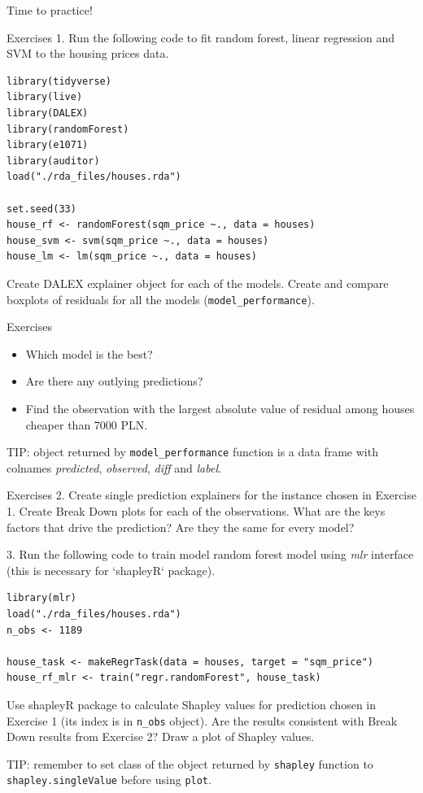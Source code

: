 \documentclass[xcolor={dvipsnames}]{beamer}
\begin{document}
\begin{frame}{Time to practice!}
	
\end{frame}


\begin{frame}[fragile]{Exercises}
1. Run the following code to fit random forest, linear regression and SVM to the housing prices data.
\begin{lstlisting}
library(tidyverse)
library(live)
library(DALEX)
library(randomForest)
library(e1071)
library(auditor)
load("./rda_files/houses.rda")

set.seed(33)
house_rf <- randomForest(sqm_price ~., data = houses)
house_svm <- svm(sqm_price ~., data = houses)
house_lm <- lm(sqm_price ~., data = houses)
\end{lstlisting}
Create DALEX explainer object for each of the models. 
Create and compare boxplots of residuals for all the models (\texttt{model\_performance}). 
\end{frame}

\begin{frame}{Exercises}
\begin{itemize}
	\item Which model is the best?
	\item Are there any outlying predictions?
	\item Find the observation with the largest absolute value of residual among houses cheaper than 7000 PLN. 
\end{itemize}

TIP: object returned by \texttt{model\_performance} function is a data frame with colnames 
\textit{predicted}, \textit{observed}, \textit{diff} and \textit{label}.
\end{frame}

\begin{frame}[fragile]{Exercises}
2. Create single prediction explainers for the instance chosen in Exercise 1.
Create Break Down plots for each of the observations. What are the keys factors that drive the prediction?
Are they the same for every model?

3. Run the following code to train model random forest model using \textit{mlr} interface 
(this is necessary for `shapleyR` package).

\begin{lstlisting}
library(mlr)
load("./rda_files/houses.rda")
n_obs <- 1189

house_task <- makeRegrTask(data = houses, target = "sqm_price")
house_rf_mlr <- train("regr.randomForest", house_task)
\end{lstlisting}
Use shapleyR package to calculate Shapley values for prediction chosen in Exercise 1 (its index is in \texttt{n\_obs} object). 
Are the results consistent with Break Down results from Exercise 2?
Draw a plot of Shapley values.

TIP: remember to set class of the object returned by \texttt{shapley} function to \texttt{shapley.singleValue} before using \texttt{plot}.

\end{frame}
\end{document}
